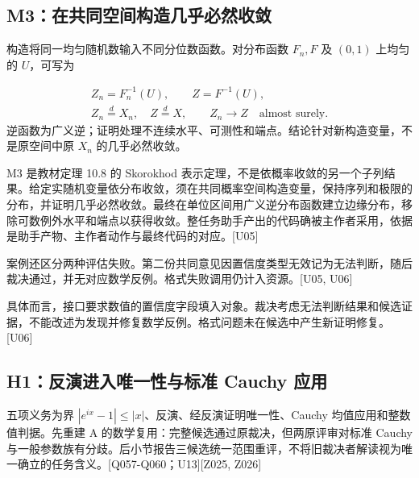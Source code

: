 \subsection[M3：在共同空间构造几乎必然收敛]{\texorpdfstring{\protect\hypertarget{g12}{}M3：在共同空间构造几乎必然收敛}{M3：在共同空间构造几乎必然收敛}}
构造将同一均匀随机数输入不同分位数函数。对分布函数 $F_n,F$ 及 $(0,1)$ 上均匀的 $U$，可写为

\[
\begin{gathered}
Z_n=F_n^{-1}(U),\qquad Z=F^{-1}(U),\\
Z_n\overset{d}=X_n,\quad Z\overset{d}=X,\qquad
Z_n\longrightarrow Z\quad\text{almost surely}.
\end{gathered}
\]
逆函数为广义逆；证明处理不连续水平、可测性和端点。结论针对新构造变量，不是原空间中原 $X_n$ 的几乎必然收敛。

M3 是教材定理 10.8 的 Skorokhod 表示定理，不是依概率收敛的另一个子列结果。给定实随机变量依分布收敛，须在共同概率空间构造变量，保持序列和极限的分布，并证明几乎必然收敛。最终在单位区间用广义逆分布函数建立边缘分布，移除可数例外水平和端点以获得收敛。整任务助手产出的代码确被主作者采用，依据是助手产物、主作者动作与最终代码的对应。[U05]

案例还区分两种评估失败。第二份共同意见因置信度类型无效记为无法判断，随后裁决通过，并无对应数学反例。格式失败调用仍计入资源。[U05, U06]

具体而言，接口要求数值的置信度字段填入对象。裁决考虑无法判断结果和候选证据，不能改述为发现并修复数学反例。格式问题未在候选中产生新证明修复。[U06]

\subsection[H1：反演进入唯一性与标准 Cauchy 应用]{\texorpdfstring{\protect\hypertarget{g13}{}H1：反演进入唯一性与标准 Cauchy 应用}{H1：反演进入唯一性与标准 Cauchy 应用}}
五项义务为界 $|e^{ix}-1|\leq |x|$、反演、经反演证明唯一性、Cauchy 均值应用和整数值判据。先重建 A 的数学复用：完整候选通过原裁决，但两原评审对标准 Cauchy 与一般参数族有分歧。后小节报告三候选统一范围重评，不将旧裁决者解读视为唯一确立的任务含义。[Q057-Q060；U13][Z025, Z026]

